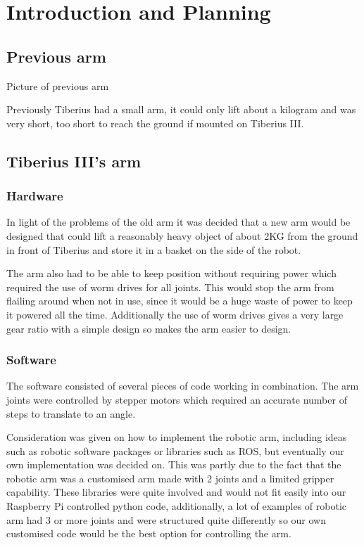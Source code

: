 \section{Introduction and Planning}
\subsection{Previous arm}
Picture of previous arm

Previously Tiberius had a small arm, it could only lift about a kilogram and was very short, too short to reach the ground if mounted on Tiberius III.  
\subsection{Tiberius III's arm}
\subsubsection{Hardware}
In light of the problems of the old arm it was decided that a new arm would be designed that could lift a reasonably heavy object of about 2KG from the ground in front of Tiberius and store it in a basket on the side of the robot.

The arm also had to be able to keep position without requiring power which required the use of worm drives for all joints. This would stop the arm from flailing around when not in use, since it would be a huge waste of power to keep it powered all the time. Additionally the use of worm drives gives a very large gear ratio with a simple design so makes the arm easier to design.

\subsubsection{Software}
The software consisted of several pieces of code working in combination.  The arm joints were controlled by stepper motors which required an accurate number of steps to translate to an angle.


Consideration was given on how to implement the robotic arm, including ideas such as robotic software packages or libraries such as ROS, but eventually our own implementation was decided on.  This was partly due to the fact that the robotic arm was a customised arm made with 2 joints and a limited gripper capability.  These libraries were quite involved and would not fit easily into our Raspberry Pi controlled python code, additionally, a lot of examples of robotic arm had 3 or more joints and were structured quite differently so our own customised code would be the best option for controlling the arm.

